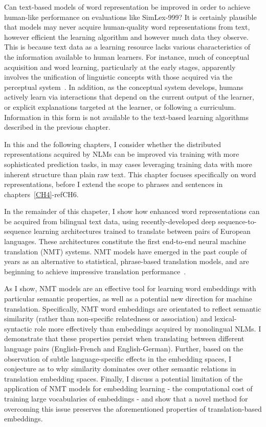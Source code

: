 \label{CH3}
Can text-based models of word representation be improved in order to achieve human-like performance on evaluations like SimLex-999? It is certainly plausible that models may never acquire human-quality word representations from text, however efficient the learning algorithm and however much data they observe. This is because text data as a learning resource lacks various characteristics of the information available to human learners. For instance, much of conceptual acquisition and word learning, particularly at the early stages, apparently involves the unification of linguistic concepts with those acquired via the perceptual system~\citep{barsalou2005situating}. In addition, as the conceptual system develops, humans actively learn via interactions that depend on the current output of the learner, or explicit explanations targeted at the learner, or following a curriculum. Information in this form is not available to the text-based learning algorithms described in the previous chapter. 

In this and the following chapters, I consider whether the distributed representations acquired by NLMs can be improved via training with more sophisticated prediction tasks, in may cases leveraging training data with more inherent structure than plain raw text. This chapter focuses specifically on word representations, before I extend the scope to phrases and sentences in chapters~\ref{CH4}-ref{CH6}.

In the remainder of this chapeter, I show how enhanced word representations can be acquired from bilingual text data, using recently-developed deep sequence-to-sequence learning architectures trained to translate between pairs of European languages. These architectures constitute the first end-to-end neural machine translation (NMT) systems. NMT models have emerged in the past couple of years as an alternative to statistical, phrase-based translation models, and are beginning to achieve impressive translation performance~\citep{kalchbrenner13emnlp,devlin2014fast,Sutskever2014sequence}. 

As I show, NMT models are an effective tool for learning word embeddings with particular semantic properties, as well as a potential new direction for machine translation. Specifically, NMT word embeddings are orientated to reflect semantic similarity (rather than non-specific relatedness or association) and lexical-syntactic role more effectively than embeddings acquired by monolingual NLMs. I demonstrate that these properties persist when translating between different language pairs (English-French and English-German). Further, based on the observation of subtle language-specific effects in the embedding spaces, I conjecture as to why similarity dominates over other semantic relations in translation embedding spaces. Finally, I discuss a potential limitation of the application of NMT models for embedding learning - the computational cost of training large vocabularies of embeddings - and show that a novel method for overcoming this issue preserves the aforementioned properties of translation-based embeddings. 

